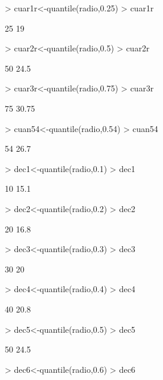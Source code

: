 \documentclass [a4paper] {article}
\begin{document}
\begin{Schunk}
\begin{Sinput}
> cuar1r<-quantile(radio,0.25) 
> cuar1r
\end{Sinput}
\begin{Soutput}
25%
 19 
\end{Soutput}
\begin{Sinput}
> cuar2r<-quantile(radio,0.5) 
> cuar2r
\end{Sinput}
\begin{Soutput}
 50%
24.5 
\end{Soutput}
\begin{Sinput}
> cuar3r<-quantile(radio,0.75) 
> cuar3r
\end{Sinput}
\begin{Soutput}
  75%
30.75 
\end{Soutput}
\begin{Sinput}
> cuan54<-quantile(radio,0.54)
> cuan54
\end{Sinput}
\begin{Soutput}
 54%
26.7 
\end{Soutput}
\begin{Sinput}
> dec1<-quantile(radio,0.1)
> dec1
\end{Sinput}
\begin{Soutput}
 10%
15.1 
\end{Soutput}
\begin{Sinput}
> dec2<-quantile(radio,0.2)
> dec2
\end{Sinput}
\begin{Soutput}
 20%
16.8 
\end{Soutput}
\begin{Sinput}
> dec3<-quantile(radio,0.3)
> dec3
\end{Sinput}
\begin{Soutput}
30%
 20 
\end{Soutput}
\begin{Sinput}
> dec4<-quantile(radio,0.4)
> dec4
\end{Sinput}
\begin{Soutput}
 40%
20.8 
\end{Soutput}
\begin{Sinput}
> dec5<-quantile(radio,0.5)
> dec5
\end{Sinput}
\begin{Soutput}
 50%
24.5 
\end{Soutput}
\begin{Sinput}
> dec6<-quantile(radio,0.6)
> dec6
\end{Sinput}

\end{Schunk}
\end{document}
